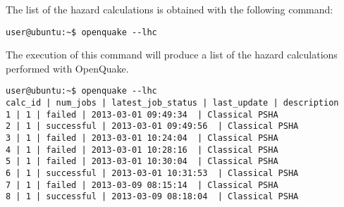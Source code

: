 The list of the hazard calculations is obtained with 
the following command:
\begin{Verbatim}[frame=single, commandchars=\\\{\}, fontsize=\small]
user@ubuntu:~$ openquake --lhc
\end{Verbatim}
The execution of this command will produce a list of the hazard 
calculations performed with OpenQuake.
\begin{Verbatim}[frame=single, commandchars=\\\{\}, fontsize=\small]
user@ubuntu:~$ openquake --lhc
calc_id | num_jobs | latest_job_status | last_update | description
1 | 1 | failed | 2013-03-01 09:49:34  | Classical PSHA
2 | 1 | successful | 2013-03-01 09:49:56  | Classical PSHA
3 | 1 | failed | 2013-03-01 10:24:04  | Classical PSHA
4 | 1 | failed | 2013-03-01 10:28:16  | Classical PSHA
5 | 1 | failed | 2013-03-01 10:30:04  | Classical PSHA
6 | 1 | successful | 2013-03-01 10:31:53  | Classical PSHA
7 | 1 | failed | 2013-03-09 08:15:14  | Classical PSHA
8 | 1 | successful | 2013-03-09 08:18:04  | Classical PSHA
\end{Verbatim}



